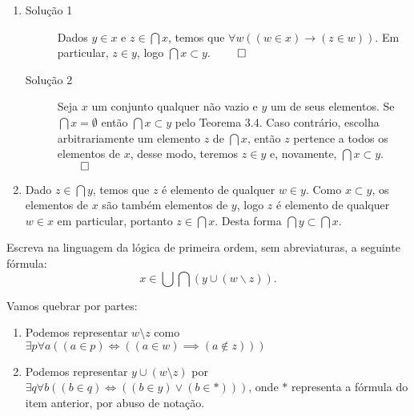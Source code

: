 \begin{enumerate}[label=(\alph{*})]
	\item
		\begin{description}
			\item[Solução 1] Dados $y\in x$ e $z\in\bigcap x$, temos que $\forall w((w\in x)\to(z\in w))$. Em particular, $z\in y$, logo $\bigcap x\subset y$. $\qed$
			\item[Solução 2] Seja $x$ um conjunto qualquer não vazio e $y$ um de seus elementos. Se $\bigcap x = \emptyset$ então $\bigcap x \subset y$ pelo Teorema 3.4. Caso contrário, escolha arbitrariamente um elemento $z$ de $\bigcap x$, então $z$ pertence a todos os elementos de $x$, desse modo, teremos $z \in y$ e, novamente, $\bigcap x \subset y$. $\qed$
		\end{description}
	\item Dado $z\in\bigcap y$, temos que $z$ é elemento de qualquer $w\in y$. Como $x\subset y$, os elementos de $x$ são também elementos de  $y$, logo $z$ é elemento de qualquer $w\in x$ em particular, portanto $z\in\bigcap x$. Desta forma $\bigcap y\subset\bigcap x$.
\end{enumerate}


\begin{exercicio}
	Escreva na linguagem da lógica de primeira ordem, sem abreviaturas, a seguinte fórmula:
	$$x\in\bigcup\bigcap(y\cup(w\backslash z)).$$
\end{exercicio}
\begin{solucao}
	Vamos quebrar por partes:
	\begin{enumerate}[label=\textit{\arabic*º}, left=0pt, itemsep=0.5em]
		\item Podemos representar $w \setminus z$ como $\exists p \forall a ((a \in p) \iff ((a \in w) \implies (a \notin z)))$
		\item Podemos representar $y \cup (w \setminus z)$ por $\exists q \forall b ((b \in q) \iff ((b \in y) \lor (b \in *)) )$, onde $*$ representa a fórmula do item anterior, por abuso de notação.
	\end{enumerate}
\end{solucao}

